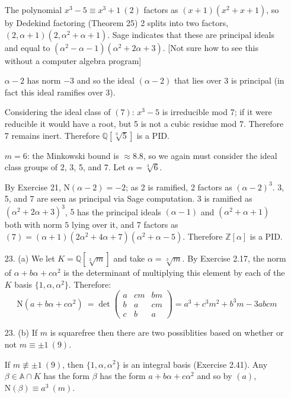 \documentclass{article}
\newcommand{\Q}[0]{\mathbb{Q}}
\newcommand{\Z}[0]{\mathbb{Z}}
\newcommand{\norm}[0]{\text{N}}
\newcommand{\modequiv}[3]{#1 \equiv #2\ (#3)}
\newcommand{\ringofintegers}[1]{\mathbb{A} \cap #1}
\begin{document}
\begin{enumerate}
    The polynomial $\modequiv{x^3 - 5}{x^3 + 1}{2}$ factors as $(x + 1)(x^2 + x + 1)$, so by Dedekind factoring (Theorem 25) 2 splits into two factors, $(2, \alpha + 1)(2, \alpha^2 + \alpha + 1)$.  Sage indicates that these are principal ideals and equal to $(\alpha^2 - \alpha - 1)(\alpha^2 + 2\alpha + 3)$.  [Not sure how to see this without a computer algebra program]

    $\alpha - 2$ has norm $-3$ and so the ideal $(\alpha - 2)$ that lies over 3 is principal (in fact this ideal ramifies over 3).

    Considering the ideal class of $(7)$: $x^3 - 5$ is irreducible mod 7; if it were reducible it would have a root, but 5 is not a cubic residue mod 7.  Therefore 7 remains inert.  Therefore $\Q[\sqrt[3]{5}]$ is a PID.

    $m = 6$: the Minkowski bound is $\approx 8.8$, so we again must consider the ideal class groups of 2, 3, 5, and 7.  Let $\alpha = \sqrt[3]{6}$.

    By Exercise 21, $\norm(\alpha - 2) = -2$; as 2 is ramified, 2 factors as $(\alpha - 2)^3$.  3, 5, and 7 are seen as principal via Sage computation.  $3$ is ramified as $(\alpha^2 + 2\alpha +3)^3$, $5$ has the principal ideals $(\alpha -1)$ and $(\alpha^2 + \alpha + 1)$ both with norm $5$ lying over it, and 7 factors as $(7) = (\alpha + 1)(2\alpha^2 + 4\alpha + 7)(\alpha^2 + \alpha - 5)$.  Therefore $\Z[\alpha]$ is a PID.

    \item[23. (a)] We let $K = \Q[\sqrt[3]{m}]$ and take $\alpha = \sqrt[3]{m}$.  By Exercise 2.17, the norm of $\alpha + b\alpha + c\alpha^2$ is the determinant of multiplying this element by each of the $K$ basis $\{1, \alpha, \alpha^2\}$.  Therefore:
    \[
        \norm(a + b\alpha + c\alpha^2)\ =\det\left(
        \begin{matrix}
            a & cm &bm \\
            b & a & cm \\
            c & b & a
        \end{matrix}\right) = a^3 + c^3 m^2 + b^3 m - 3abcm
    \]
    \item[23. (b)] If $m$ is squarefree then there are two possiblities based on whether or not $m \equiv \pm 1\ (9)$.

    If $m \not\equiv \pm 1\ (9)$, then $\{1, \alpha, \alpha^2\}$ is an integral basis (Exercise 2.41).  Any $\beta \in \ringofintegers{K}$ has the form $\beta$ has the form $a + b\alpha  + c\alpha^2$ and so by $(a)$, $\modequiv{\norm(\beta)}{a^3}{m}$.


\end{enumerate}
\end{document}
